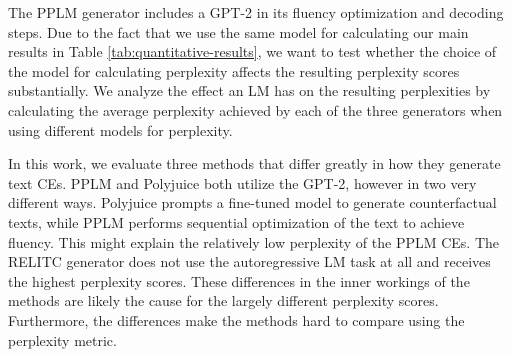 \documentclass[11pt]{article}
\begin{document}
\begin{table*}[!ht]
\caption{Comparison of perplexity-based metrics computed using three language models. The base GPT-2, an Open Pretrained Transformer (OPT) \cite{zhang_opt_2022} opt-125m (\url{https://huggingface.co/facebook/opt-125m}), and a GPT-2 model fine-tuned on four financial datasets (\url{https://huggingface.co/lxyuan/distilgpt2-finetuned-finance}).}
\label{appendix:perplexity-models}
\end{table*}


The PPLM generator includes a GPT-2 in its fluency optimization and decoding steps. Due to the fact that we use the same model for calculating our main results in Table 
\ref{tab:quantitative-results}, we want to test whether the choice of the model for calculating perplexity affects the resulting perplexity scores substantially. We analyze the effect an LM has on the resulting perplexities by calculating the average perplexity achieved by each of the three generators when using different models for perplexity.

In this work, we evaluate three methods that differ greatly in how they generate text CEs. PPLM and Polyjuice both utilize the GPT-2, however in two very different ways. Polyjuice prompts a fine-tuned model to generate counterfactual texts, while PPLM performs sequential optimization of the text to achieve fluency. This might explain the relatively low perplexity of the PPLM CEs. The RELITC generator does not use the autoregressive LM task at all and receives the highest perplexity scores. These differences in the inner workings of the methods are likely the cause for the largely different perplexity scores. Furthermore, the differences make the methods hard to compare using the perplexity metric. 
\end{document}
